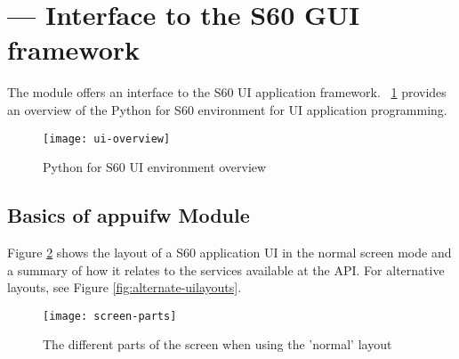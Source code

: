 %
%
%

\newlength{\screenwidth}
\setlength{\screenwidth}{0.3\textwidth}
\label{sec:appuifw}

\section{ ---
	 Interface to the S60 GUI framework}


The  module offers an interface to the S60 UI application
framework. \figurename~\ref{fig:ui-overview} provides an overview of
the Python for S60 environment for UI application programming.


\begin{figure}
\centering
\texttt{[image: ui-overview]}
\caption{Python for S60 UI environment overview}
\label{fig:ui-overview}
\end{figure}

\subsection{Basics of appuifw Module}
\label{subsec:basics}
Figure \ref{fig:normal-uilayout} shows the layout of a S60 application 
UI in the normal screen mode and a summary of how it relates to the services 
available at the  API. For alternative layouts, see 
Figure \ref{fig:alternate-uilayouts}.

\begin{figure}
\centering
\texttt{[image: screen-parts]}
\caption{The different parts of the screen when using the 'normal' layout}
\label{fig:normal-uilayout}
\end{figure}

